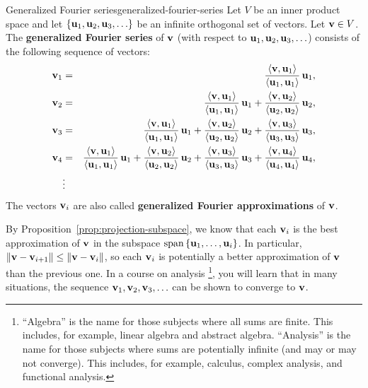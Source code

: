 \begin{definition}{Generalized Fourier series}{generalized-fourier-series}
  Let $V$ be an inner product space and let
  $\set{\vect{u}_1,\vect{u}_2,\vect{u}_3,\ldots}$ be an infinite
  orthogonal set of vectors.  Let $\vect{v}\in V$. The
  \textbf{generalized Fourier series}%
   of $\vect{v}$ (with respect to
  $\vect{u}_1,\vect{u}_2,\vect{u}_3,\ldots$) consists of the following
  sequence of vectors:
  \begin{eqnarray*}
    \vect{v}_1
    &=& \frac{\iprod{\vect{v},\vect{u}_1}}{\iprod{\vect{u}_1,\vect{u}_1}}\,\vect{u}_1, \\
    \vect{v}_2
    &=& \frac{\iprod{\vect{v},\vect{u}_1}}{\iprod{\vect{u}_1,\vect{u}_1}}\,\vect{u}_1
        + \frac{\iprod{\vect{v},\vect{u}_2}}{\iprod{\vect{u}_2,\vect{u}_2}}\,\vect{u}_2, \\
    \vect{v}_3
    &=& \frac{\iprod{\vect{v},\vect{u}_1}}{\iprod{\vect{u}_1,\vect{u}_1}}\,\vect{u}_1
        + \frac{\iprod{\vect{v},\vect{u}_2}}{\iprod{\vect{u}_2,\vect{u}_2}}\,\vect{u}_2
        + \frac{\iprod{\vect{v},\vect{u}_3}}{\iprod{\vect{u}_3,\vect{u}_3}}\,\vect{u}_3, \\
    \vect{v}_4
    &=& \frac{\iprod{\vect{v},\vect{u}_1}}{\iprod{\vect{u}_1,\vect{u}_1}}\,\vect{u}_1
        + \frac{\iprod{\vect{v},\vect{u}_2}}{\iprod{\vect{u}_2,\vect{u}_2}}\,\vect{u}_2
        + \frac{\iprod{\vect{v},\vect{u}_3}}{\iprod{\vect{u}_3,\vect{u}_3}}\,\vect{u}_3
        + \frac{\iprod{\vect{v},\vect{u}_4}}{\iprod{\vect{u}_4,\vect{u}_4}}\,\vect{u}_4, \\
    &\vdots        &
  \end{eqnarray*}
  The vectors $\vect{v}_i$ are also called \textbf{generalized Fourier
    approximations}%
   of $\vect{v}$.
\end{definition}

By Proposition~\ref{prop:projection-subspace}, we know that each
$\vect{v}_i$ is the best approximation of $\vect{v}$ in the subspace
$\sspan\set{\vect{u}_1,\ldots,\vect{u}_i}$. In particular,
$\norm{\vect{v}-\vect{v}_{i+1}} \leq \norm{\vect{v}-\vect{v}_i}$, so
each $\vect{v}_i$ is potentially a better approximation of $\vect{v}$
than the previous one. In a course on analysis%
\footnote{``Algebra'' is the name for those subjects where all sums
  are finite. This includes, for example, linear algebra and abstract
  algebra. ``Analysis'' is the name for those subjects where sums are
  potentially infinite (and may or may not converge). This includes,
  for example, calculus, complex analysis, and functional analysis.},
you will learn that in many situations, the sequence
$\vect{v}_1,\vect{v}_2,\vect{v}_3,\ldots$ can be shown to converge to
$\vect{v}$.

